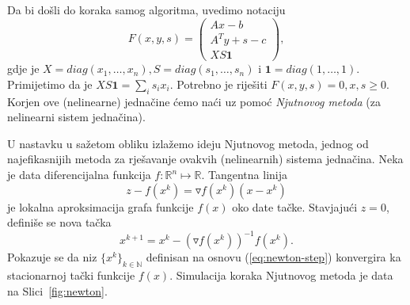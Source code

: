\documentclass[a4paper, utf8, 11pt, colorlinks]{book}
\theoremstyle{definition}
\begin{document}
Da bi došli do koraka samog algoritma, uvedimo notaciju 
$$ F(x, y, s) = \left (\begin{array}{c}
	Ax - b           \\
	A^T y + s - c     \\
	X S \textbf{1}                   
\end{array} \right ),$$
gdje je  $X = diag (x_1, \ldots, x_n ), S = diag(s_1,\ldots, s_n)$ i 
$\textbf{1} = diag (1,\ldots, 1)$. Primijetimo da  je $X S \textbf{1}=\sum_{i} s_i x_i$. 
Potrebno je riješiti $F(x, y, s ) = 0, x,s \geq 0$. Korjen ove (nelinearne) jednačine ćemo naći uz pomoć \emph{Njutnovog metoda} (za nelinearni sistem jednačina).  %

U nastavku u sažetom obliku izlažemo ideju Njutnovog metoda, jednog od najefikasnijih metoda za rješavanje ovakvih (nelinearnih) sistema jednačina. Neka je data diferencijalna funkcija $f: \mathbb{R}^n \mapsto \mathbb{R}$.   Tangentna linija 
$$z - f(x^k) = \triangledown f(x^k) (x - x^k) $$
je lokalna aproksimacija grafa funkcije $f(x)$ oko date tačke. Stavjajući $z=0$, definiše se nova tačka 
\begin{equation} \label{eq:newton-step}
	x^{k+1} = x^k - (\triangledown f(x^k))^{-1} f(x^k).
\end{equation}
Pokazuje se da niz $\{x^k\}_{k \in \mathbb{N}}$ definisan na osnovu (\ref{eq:newton-step}) konvergira ka stacionarnoj tački funkcije $f(x)$. Simulacija koraka Njutnovog metoda je data na Slici~\ref{fig:newton}. 
\end{document}
